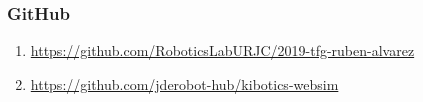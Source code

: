 \documentclass[xcolor={table}]{beamer}
\begin{document}
	\appendix

	\backupbegin
	  \begin{frame}
	    \frametitle{GitHub}
	    \begin{enumerate}
	        \item \url{https://github.com/RoboticsLabURJC/2019-tfg-ruben-alvarez}
	        
	        \item \url{https://github.com/jderobot-hub/kibotics-websim}
	        
	    \end{enumerate}	  \end{frame}
	\backupend
\end{document}
